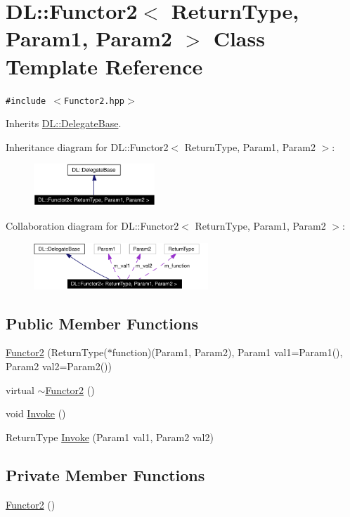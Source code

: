 \hypertarget{classDL_1_1Functor2}{
\section{DL::Functor2$<$ Return\-Type, Param1, Param2 $>$ Class Template Reference}
\label{classDL_1_1Functor2}
}
{\tt \#include $<$Functor2.hpp$>$}

Inherits \hyperlink{classDL_1_1DelegateBase}{DL::Delegate\-Base}.

Inheritance diagram for DL::Functor2$<$ Return\-Type, Param1, Param2 $>$:\begin{figure}[H]
\begin{center}
\leavevmode
\includegraphics[width=129pt]{classDL_1_1Functor2__inherit__graph}
\end{center}
\end{figure}
Collaboration diagram for DL::Functor2$<$ Return\-Type, Param1, Param2 $>$:\begin{figure}[H]
\begin{center}
\leavevmode
\includegraphics[width=186pt]{classDL_1_1Functor2__coll__graph}
\end{center}
\end{figure}
\subsection*{Public Member Functions}
\begin{CompactItemize}
\item 
\hyperlink{classDL_1_1Functor2_a0}{Functor2} (Return\-Type($\ast$function)(Param1, Param2), Param1 val1=Param1(), Param2 val2=Param2())
\item 
virtual \hyperlink{classDL_1_1Functor2_a1}{$\sim$Functor2} ()
\item 
void \hyperlink{classDL_1_1Functor2_a2}{Invoke} ()
\item 
Return\-Type \hyperlink{classDL_1_1Functor2_a3}{Invoke} (Param1 val1, Param2 val2)
\end{CompactItemize}
\subsection*{Private Member Functions}
\begin{CompactItemize}
\item 
\hyperlink{classDL_1_1Functor2_d0}{Functor2} ()
\end{CompactItemize}
